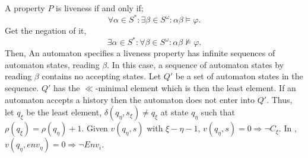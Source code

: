 \documentclass[12pt,a4paper,titlepage]{article}
\theoremstyle{break}
\begin{document}
A property $P$ is liveness if and only if;
  \begin{displaymath}
\forall\alpha\in S^{*}\colon\exists\beta\in S^{\omega}\colon\alpha\beta\models\varphi.
  \end{displaymath}
Get the negation of it,
  \begin{displaymath}
\exists\alpha\in S^{*}\colon\forall\beta\in S^{\omega}\colon\alpha\beta\not\models\varphi.
  \end{displaymath}
Then, An automaton specifies a liveness property has infinite sequences of automaton states, reading \(\beta\).
In this case, a sequence of automaton states by reading \(\beta\) contains no accepting states.
Let \(Q'\) be a set of automaton states in the sequence.
\(Q'\) has the \(\ll\)-minimal element which is then the least element.
If an automaton accepts a history then the automaton does not enter into \(Q'\).
Thus, let \(q_{\xi}\) be the least element, \(\delta(q_{\eta},s_{\xi})\neq q_{\xi}\) at state \(q_{\eta}\) such that \(\rho(q_{\xi})=\rho(q_{\eta})+1\).
Given \(v(q_{\eta},s)\) with \(\xi-\eta-1\), \(v(q_{\eta},s)=0\Rightarrow\neg C_{\xi}\).
In \NHK, \(v(q_{\eta},env_{\eta})=0\Rightarrow\neg Env_i\).
\end{document}
